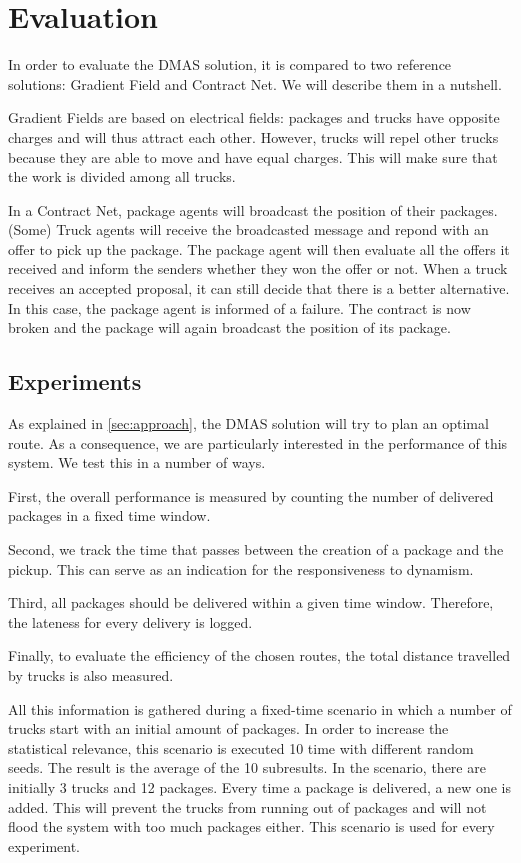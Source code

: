 \section{Evaluation}

\npar In order to evaluate the DMAS solution, it is compared to two reference
solutions: Gradient Field and Contract Net. We will describe them in a nutshell.

\npar Gradient Fields are based on electrical fields: packages and trucks have
opposite charges and will thus attract each other. However, trucks will repel
other trucks because they are able to move and have equal charges.
This will make sure that the work is divided among all trucks.

\npar In a Contract Net, package agents will broadcast the position of their
packages. (Some) Truck agents will receive the broadcasted message and repond
with an offer to pick up the package. The package agent will then evaluate all
the offers it received and inform the senders whether they won the offer or not.
When a truck receives an accepted proposal, it can still decide that there is a
better alternative. In this case, the package agent is informed of a failure.
The contract is now broken and the package will again broadcast the position of
its package.

\subsection{Experiments}

\npar As explained in \ref{sec:approach}, the DMAS solution will try to
plan an optimal route. As a consequence, we are particularly interested in the
performance of this system. We test this in a number of ways.

\npar First, the overall performance is measured by counting the number of
delivered packages in a fixed time window.

\npar Second, we track the time that passes between the creation of a package
and the pickup. This can serve as an indication for the responsiveness to
dynamism.

\npar Third, all packages should be delivered within a given time window.
Therefore, the lateness for every delivery is logged.

\npar Finally, to evaluate the efficiency of the chosen routes, the
total distance travelled by trucks is also measured. 

\npar All this information is gathered during a fixed-time scenario in which a
number of trucks start with an initial amount of packages. In order to increase
the statistical relevance, this scenario is executed 10 time with different
random seeds. The result is the average of the 10 subresults. In the scenario,
there are initially 3 trucks and 12 packages. Every time a package is delivered,
a new one is added. This will prevent the trucks from running out of packages
and will not flood the system with too much packages either. This scenario is
used for every experiment.

